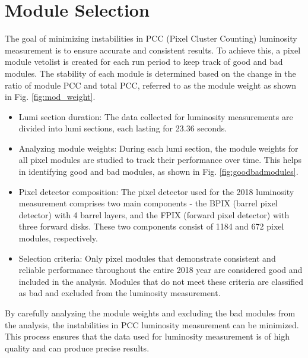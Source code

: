 \section{Module Selection}

The goal of minimizing instabilities in PCC (Pixel Cluster Counting) luminosity measurement is to ensure accurate and consistent results. To achieve this, a pixel module vetolist is created for each run period to keep track of good and bad modules. The stability of each module is determined based on the change in the ratio of module PCC and total PCC, referred to as the module weight as shown in Fig. \ref{fig:mod_weight}.

\begin{itemize}

\item Lumi section duration: The data collected for luminosity measurements are divided into lumi sections, each lasting for 23.36 seconds.

\item Analyzing module weights: During each lumi section, the module weights for all pixel modules are studied to track their performance over time. This helps in identifying good and bad modules, as shown in Fig. \ref{fig:goodbadmodules}.

\item Pixel detector composition: The pixel detector used for the 2018 luminosity measurement comprises two main components - the BPIX (barrel pixel detector) with 4 barrel layers, and the FPIX (forward pixel detector) with three forward disks. These two components consist of 1184 and 672 pixel modules, respectively.

\item Selection criteria: Only pixel modules that demonstrate consistent and reliable performance throughout the entire 2018 year are considered good and included in the analysis. Modules that do not meet these criteria are classified as bad and excluded from the luminosity measurement.

\end{itemize}

By carefully analyzing the module weights and excluding the bad modules from the analysis, the instabilities in PCC luminosity measurement can be minimized. This process ensures that the data used for luminosity measurement is of high quality and can produce precise results.


